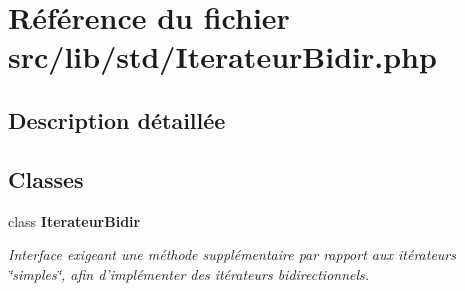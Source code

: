 \section{Référence du fichier src/lib/std/IterateurBidir.php}
\label{_iterateur_bidir_8php}


\subsection{Description détaillée}


\subsection*{Classes}
\begin{CompactItemize}
\item 
class {\bf IterateurBidir}
\begin{CompactList}\small\item\em Interface exigeant une méthode supplémentaire par rapport aux itérateurs \char`\"{}simples\char`\"{}, afin d'implémenter des itérateurs bidirectionnels. \item\end{CompactList}\end{CompactItemize}
